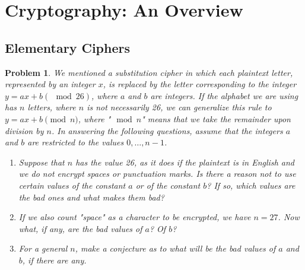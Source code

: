 \documentclass[12pt]{article}
\newtheorem{problem}{Problem}
\theoremstyle{remark}  %
\begin{document}
\setlength{\abovecaptionskip}{0pt} %
%

\rhead{\today}

\section{Cryptography: An Overview}
\subsection{Elementary Ciphers}

    \begin{problem}
        We mentioned a substitution cipher in which each plaintext letter, represented by an integer $x$, is replaced by the letter corresponding to the integer $y=ax+b(\mod 26)$, where $a$ and $b$ are integers. If the alphabet we are using has $n$ letters, where $n$ is not necessarily 26, we can generalize this rule to $y=ax+b \pmod{n}$, where "$\mod n$" means that we take the remainder upon division by $n$. In answering the following questions, assume that the integers $a$ and $b$ are restricted to the values $0,\dots,n-1$.
        \begin{enumerate}[label=(\alph*)]
            \item Suppose that $n$ has the value 26, as it does if the plaintext is in English and we do not encrypt spaces or punctuation marks. Is there a reason not to use certain values of the constant $a$ or of the constant $b$? If so, which values are the bad ones and what makes them bad?
            \item If we also count "space" as a character to be encrypted, we have $n=27$. Now what, if any, are the bad values of $a$? Of $b$?
            \item For a general $n$, make a conjecture as to what will be the bad values of $a$ and $b$, if there are any.
        \end{enumerate}
    \end{problem}
\end{document}
